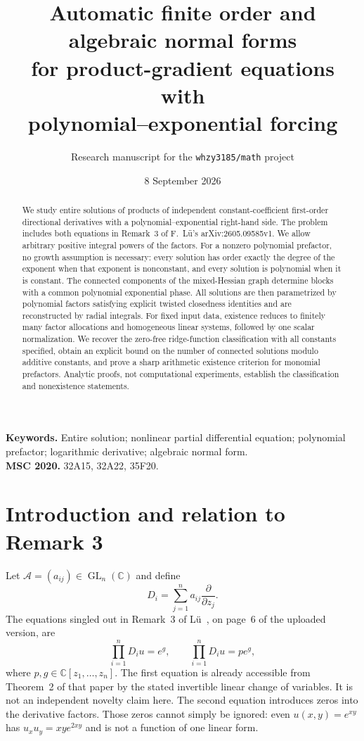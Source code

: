 \documentclass[11pt]{article}
\title{Automatic finite order and algebraic normal forms\\
for product-gradient equations with\\
polynomial--exponential forcing}
\author{Research manuscript for the \texttt{whzy3185/math} project}
\date{8 September 2026}
\numberwithin{equation}{section}
\theoremstyle{definition}\newtheorem{definition}[theorem]{Definition}
\theoremstyle{remark}\newtheorem{remark}[theorem]{Remark}
\newcommand{\C}{\mathbb C}
\newcommand{\Ac}{\mathcal A}
\begin{document}
\maketitle
\begin{abstract}
We study entire solutions of products of independent constant-coefficient
first-order directional derivatives with a polynomial--exponential right-hand
side. The problem includes both equations in Remark~3 of F.~L\"u's
arXiv:2605.09585v1. We allow arbitrary positive integral powers of the factors.
For a nonzero polynomial prefactor, no growth assumption is necessary:
every solution has order exactly the degree of the exponent when that exponent
is nonconstant, and every solution is polynomial when it is constant.
The connected components of the mixed-Hessian graph determine blocks with a
common polynomial exponential phase. All solutions are then parametrized by
polynomial factors satisfying explicit twisted closedness identities and are
reconstructed by radial integrals. For fixed input data, existence reduces to
finitely many factor allocations and homogeneous linear systems, followed by
one scalar normalization. We recover the zero-free ridge-function
classification with all constants specified, obtain an explicit bound on the
number of connected solutions modulo additive constants, and prove a sharp
arithmetic existence criterion for monomial prefactors. Analytic proofs, not
computational experiments, establish the classification and nonexistence
statements.
\end{abstract}
\noindent\textbf{Keywords.} Entire solution; nonlinear partial differential equation;
polynomial prefactor; logarithmic derivative; algebraic normal form.\\
\textbf{MSC 2020.} 32A15, 32A22, 35F20.

\section{Introduction and relation to Remark 3}
Let $\Ac=(a_{ij})\in\operatorname{GL}_n(\C)$ and define
\[
 D_i=\sum_{j=1}^n a_{ij}\frac{\partial}{\partial z_j}.
\]
The equations singled out in Remark~3 of L\"u~\cite{Lu2026}, on page~6 of
the uploaded version, are
\begin{equation}\label{eq:remark}
 \prod_{i=1}^n D_i u=e^g,
 \qquad
 \prod_{i=1}^n D_i u=p e^g,
\end{equation}
where $p,g\in\C[z_1,\ldots,z_n]$. The first equation is already accessible
from Theorem~2 of that paper by the stated invertible linear change of
variables. It is not an independent novelty claim here. The second equation
introduces zeros into the derivative factors. Those zeros cannot simply be
ignored: even $u(x,y)=e^{xy}$ has $u_xu_y=xy e^{2xy}$ and is not a function
of one linear form.
\end{document}
